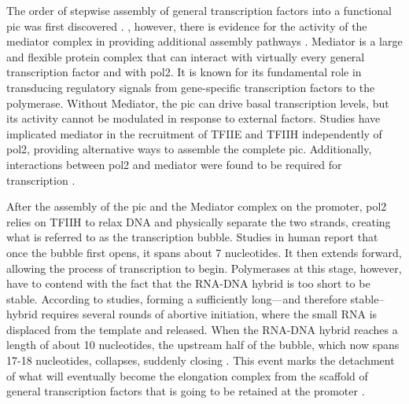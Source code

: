 The order of stepwise assembly of general transcription factors into a functional \gls{pic} was first discovered \invitro{} \cite{buratowski:1989:five}. 
\Invivo{}, however, there is evidence for the activity of the mediator complex in providing additional assembly pathways \cite{esnault:2008:mediatordependent}.
Mediator is a large and flexible protein complex that can interact with virtually every general transcription factor and with \gls{pol2}.
It is known for its fundamental role in transducing regulatory signals from gene-specific transcription factors to the polymerase.
Without Mediator, the \gls{pic} can drive basal transcription levels, but its activity cannot be modulated in response to external factors.
Studies have implicated mediator in the recruitment of TFIIE and TFIIH independently of \gls{pol2}, providing alternative ways to assemble the complete \gls{pic}.
Additionally, interactions between \gls{pol2} and mediator were found to be required for transcription \invivo{} \cite{soutourina:2011:direct}.

After the assembly of the \gls{pic} and the Mediator complex on the promoter, \gls{pol2} relies on TFIIH to relax DNA and physically separate the two strands, creating what is referred to as the transcription bubble.
Studies in human report that once the bubble first opens, it spans about 7 nucleotides.
It then extends forward, allowing the process of transcription to begin.
Polymerases at this stage, however, have to contend with the fact that the RNA-DNA hybrid is too short to be stable.
According to \invitro{} studies, forming a sufficiently long---and therefore stable--hybrid requires several rounds of abortive initiation, where the small RNA is displaced from the template and released.
When the RNA-DNA hybrid reaches a length of about 10 nucleotides, the upstream half of the bubble, which now spans 17-18 nucleotides, collapses, suddenly closing \cite{holstege:1997:three}.
This event marks the detachment of what will eventually become the elongation complex from the scaffold of general transcription factors that is going to be retained at the promoter \cite{pal:2004:role}.

\clearpage